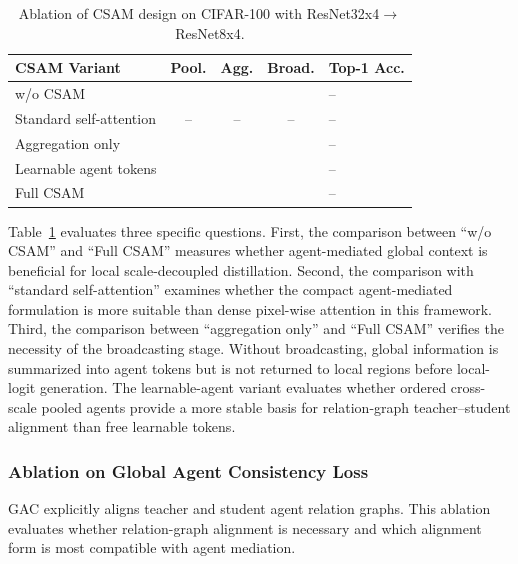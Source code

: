 \documentclass[a4paper,fleqn]{cas-dc}
\newcommand{\cmark}{\ding{51}}
\newcommand{\xmark}{\ding{55}}
\begin{document}
\begin{table}[pos=t]
\centering
\footnotesize
\caption{Ablation of CSAM design on CIFAR-100 with ResNet32x4$\rightarrow$ResNet8x4.}
\label{tab:ablation_ama_design}
\setlength{\tabcolsep}{4pt}
\renewcommand{\arraystretch}{1.08}
\begin{tabular}{@{}>{\raggedright\arraybackslash}p{}ccc>{\centering\arraybackslash}p{}@{}}
\toprule
\textbf{CSAM Variant} & \textbf{Pool.} & \textbf{Agg.} & \textbf{Broad.} & \textbf{Top-1 Acc.} \\
\midrule
w/o CSAM                & \xmark & \xmark & \xmark & -- \\
Standard self-attention & --     & --     & --     & -- \\
Aggregation only        & \cmark & \cmark & \xmark & -- \\
Learnable agent tokens  & \xmark & \cmark & \cmark & -- \\
Full CSAM               & \cmark & \cmark & \cmark & -- \\
\bottomrule
\end{tabular}
\end{table}

Table~\ref{tab:ablation_ama_design} evaluates three specific questions.
First, the comparison between ``w/o CSAM'' and ``Full CSAM'' measures whether
agent-mediated global context is beneficial for local scale-decoupled
distillation. Second, the comparison with ``standard self-attention''
examines whether the compact agent-mediated formulation is more suitable
than dense pixel-wise attention in this framework. Third, the comparison
between ``aggregation only'' and ``Full CSAM'' verifies the necessity of the
broadcasting stage. Without broadcasting, global information is summarized
into agent tokens but is not returned to local regions before local-logit
generation. The learnable-agent variant evaluates whether ordered
cross-scale pooled agents provide a more stable basis for relation-graph
teacher--student alignment than free learnable tokens.

\subsubsection{Ablation on Global Agent Consistency Loss}

GAC explicitly aligns teacher and student agent relation graphs. This
ablation evaluates whether relation-graph alignment is necessary and which
alignment form is most compatible with agent mediation.
\end{document}
